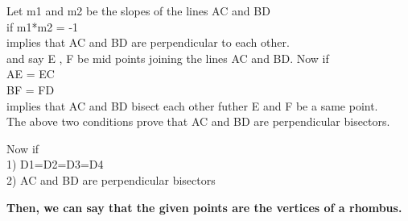 \documentclass{article}
\begin{document}
\vspace{20cm}


Let m1 and m2 be the slopes of the lines AC and BD \\
if m1*m2 = -1 \\
implies that AC and BD are perpendicular to each other.\\ 

and say E , F be mid points joining the lines AC and BD. Now if\\
AE = EC \\
BF = FD \\ 
implies that AC and BD bisect each other futher E and F be a same point.\\

The above two conditions prove that AC and BD are perpendicular bisectors.
\vspace{5mm} %

Now if \\ 1) D1=D2=D3=D4\\ 
2) AC and BD are perpendicular bisectors

\vspace{5mm} %
\textbf{Then, we can say that the given points are the vertices of a rhombus.}
\end{document}
